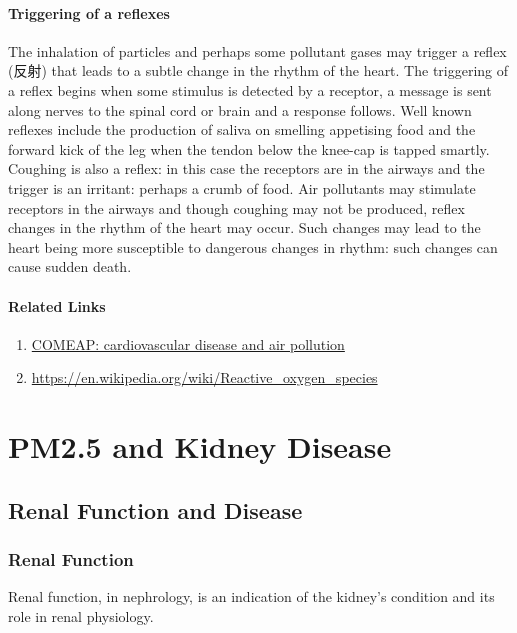 \documentclass[11pt]{article}
\begin{document}
\paragraph{Triggering of a reflexes} The inhalation of particles and perhaps some pollutant gases may trigger a reflex (反射) that leads to a subtle change in the rhythm of the heart. The triggering of a reflex begins when some stimulus is detected by a receptor, a message is sent along nerves to the spinal cord or brain and a response follows. Well known reflexes include the production of saliva on smelling appetising food and the forward kick of the leg when the tendon below the knee-cap is tapped smartly. Coughing is also a reflex: in this case the receptors are in the airways and the trigger is an irritant: perhaps a crumb of food. Air pollutants may stimulate receptors in the airways and though coughing may not be produced, reflex changes in the rhythm of the heart may occur. Such changes may lead to the heart being more susceptible to dangerous changes in rhythm: such changes can cause sudden death. 

\paragraph{Related Links}

\begin{enumerate}
    \item \href{https://www.gov.uk/government/publications/comeap-cardiovascular-disease-and-air-pollution}{COMEAP: cardiovascular disease and air pollution}
    \item \url{https://en.wikipedia.org/wiki/Reactive_oxygen_species}
\end{enumerate}

\section{PM2.5 and Kidney Disease}

\subsection{Renal Function and Disease}

\subsubsection{Renal Function}
Renal function, in nephrology, is an indication of the kidney's condition and its role in renal physiology. 
\end{document}
